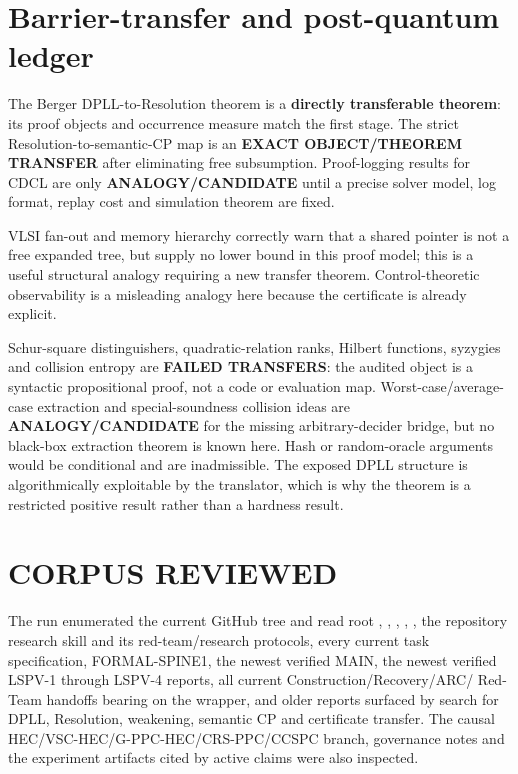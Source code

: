 \documentclass[11pt]{article}
\begin{document}
\section{Barrier-transfer and post-quantum ledger}
The Berger DPLL-to-Resolution theorem is a \textbf{directly transferable
theorem}: its proof objects and occurrence measure match the first stage.
The strict Resolution-to-semantic-CP map is an \textbf{EXACT OBJECT/THEOREM
TRANSFER} after eliminating free subsumption.  Proof-logging results for
CDCL are only \textbf{ANALOGY/CANDIDATE} until a precise solver model, log
format, replay cost and simulation theorem are fixed.

VLSI fan-out and memory hierarchy correctly warn that a shared pointer is
not a free expanded tree, but supply no lower bound in this proof model; this
is a useful structural analogy requiring a new transfer theorem.
Control-theoretic observability is a misleading analogy here because the
certificate is already explicit.

Schur-square distinguishers, quadratic-relation ranks, Hilbert functions,
syzygies and collision entropy are \textbf{FAILED TRANSFERS}: the audited
object is a syntactic propositional proof, not a code or evaluation map.
Worst-case/average-case extraction and special-soundness collision ideas are
\textbf{ANALOGY/CANDIDATE} for the missing arbitrary-decider bridge, but no
black-box extraction theorem is known here.  Hash or random-oracle arguments
would be conditional and are inadmissible.  The exposed DPLL structure is
algorithmically exploitable by the translator, which is why the theorem is a
restricted positive result rather than a hardness result.

\section{CORPUS REVIEWED}
The run enumerated the current GitHub tree and read root ,
, , , , the
repository research skill and its red-team/research protocols, every current
task specification, FORMAL-SPINE1, the newest verified MAIN, the newest
verified LSPV-1 through LSPV-4 reports, all current Construction/Recovery/ARC/
Red-Team handoffs bearing on the wrapper, and older reports surfaced by
search for DPLL, Resolution, weakening, semantic CP and certificate transfer.
The causal HEC/VSC-HEC/G-PPC-HEC/CRS-PPC/CCSPC branch, governance notes and
the experiment artifacts cited by active claims were also inspected.
\end{document}

